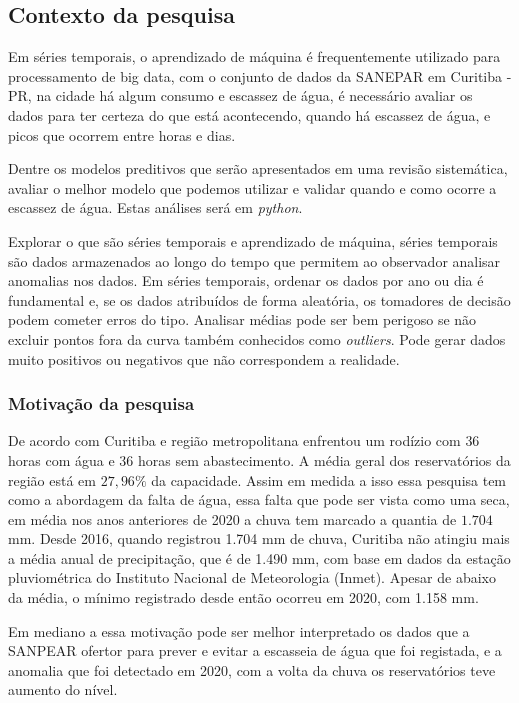 \subsection{Contexto da pesquisa} \label{subsec:contexto}
 Em séries temporais, o aprendizado de máquina é frequentemente utilizado para processamento de big data, com o conjunto de dados da SANEPAR em Curitiba - PR, na cidade há algum consumo e escassez de água, é necessário avaliar os dados para ter certeza do que está acontecendo, quando há escassez de água, e picos que ocorrem entre horas e dias.
 
 Dentre os modelos preditivos que serão apresentados em uma revisão sistemática, avaliar o melhor modelo que podemos utilizar e validar quando e como ocorre a escassez de água. Estas análises será em \textit{python}.
 
 Explorar o que são séries temporais e aprendizado de máquina, séries temporais são dados armazenados ao longo do tempo que permitem ao observador analisar anomalias nos dados. Em séries temporais, ordenar os dados por ano ou dia é fundamental e, se os dados atribuídos de forma aleatória, os tomadores de decisão podem cometer erros do tipo. 
 Analisar médias pode ser bem perigoso se não excluir pontos fora da curva também conhecidos como \textit{outliers}. Pode gerar dados muito positivos ou negativos que não correspondem a realidade.
   
      
\subsubsection{Motiva\c c\~ao da pesquisa} \label{subsubsec:motivacao}
    
    De acordo com \cite{vasconcelos_2020} Curitiba e região metropolitana enfrentou um rodízio com $36$ horas com água e $36$ horas sem abastecimento. A média geral dos reservatórios da região está em $27,96\%$ da capacidade. Assim em medida a isso essa pesquisa tem como a abordagem da falta de água, essa falta que pode ser vista como uma seca, em média nos anos anteriores de 2020 a chuva tem marcado a quantia de $1.704$ mm. \cite{vasconcelos_2020} Desde 2016, quando registrou 1.704 mm de chuva, Curitiba não atingiu mais a média anual de precipitação, que é de 1.490 mm, com base em dados da estação pluviométrica do Instituto Nacional de Meteorologia (Inmet).  Apesar de abaixo da média, o mínimo registrado desde então ocorreu em 2020, com 1.158 mm.
    
    Em mediano a essa motivação pode ser melhor interpretado os dados que a SANPEAR ofertor para prever e evitar a escasseia de água que foi registada, e a anomalia que foi detectado em 2020, com a volta da chuva os reservatórios teve aumento do nível.
    